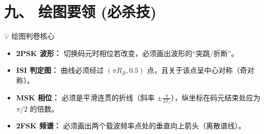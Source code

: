 \documentclass[11pt,a4paper]{ctexart} %
\begin{document}
\section{九、 绘图要领 (必杀技)}
\begin{formulaBox}{💡 绘图判卷核心}
\begin{itemize}
    \item \textbf{2PSK 波形：} 切换码元时相位若改变，必须画出波形的“突跳/折断”。
    \item \textbf{ISI 判定图：} 曲线必须经过 $(\pi R_B, 0.5)$ 点，且关于该点呈中心对称（奇对称）。
    \item \textbf{MSK 相位：} 必须是平滑连贯的折线（斜率 $\pm \frac{\pi}{2T_s}$），纵坐标在码元结束处应为 $\pi/2$ 的倍数。
    \item \textbf{2FSK 频谱：} 必须画出两个载波频率点处的垂直向上箭头（离散谱线）。
\end{itemize}
\end{formulaBox}
\end{document}
